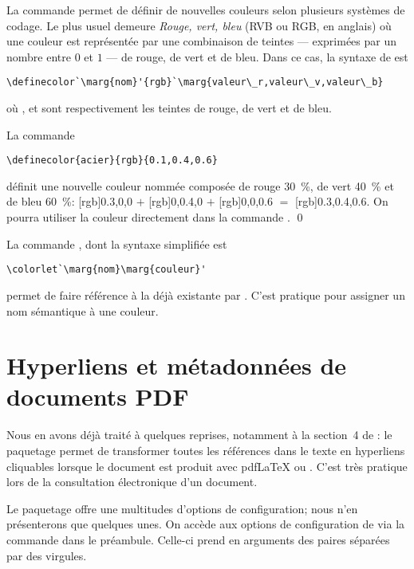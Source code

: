 La commande \cmd{\definecolor} permet de définir de nouvelles couleurs
selon plusieurs systèmes de codage. Le plus usuel demeure \emph{Rouge,
  vert, bleu} (RVB ou RGB, en anglais) où une couleur est représentée
par une combinaison de teintes --- exprimées par un nombre entre $0$
et $1$ --- de rouge, de vert et de bleu. Dans ce cas, la syntaxe de
\cmd{\definecolor} est
\begin{lstlisting}
\definecolor`\marg{nom}'{rgb}`\marg{valeur\_r,valeur\_v,valeur\_b}
\end{lstlisting}
où ,  et  sont
respectivement les teintes de rouge, de vert et de bleu.

\begin{exemple}
  La commande
\begin{lstlisting}
\definecolor{acier}{rgb}{0.1,0.4,0.6}
\end{lstlisting}
  définit une nouvelle couleur nommée  composée de rouge
  30~\%, de vert 40~\% et de bleu 60~\%: %
  [rgb]{0.3,0,0}{\phantom{xx}} $+$ %
  [rgb]{0,0.4,0}{\phantom{xx}} $+$ %
  [rgb]{0,0,0.6}{\phantom{xx}} $=$ %
  [rgb]{0.3,0.4,0.6}{\phantom{xx}}. %
  On pourra utiliser la couleur  directement dans la
  commande \cmdprint{\color}. %
  \qed
\end{exemple}

La commande , dont la syntaxe simplifiée est
\begin{lstlisting}
\colorlet`\marg{nom}\marg{couleur}'
\end{lstlisting}
permet de faire référence à la  déjà existante par
. C'est pratique pour assigner un nom sémantique à une
couleur.



\section{Hyperliens et métadonnées de documents PDF}
\label{sec:trucs:hyperliens}

Nous en avons déjà traité à quelques reprises, notamment à la
section~4 de \citet{UL:latex:1}: le paquetage 
\citep{hyperref} permet de transformer toutes les références dans le
texte en hyperliens cliquables lorsque le document est produit avec
pdf{\LaTeX} ou {\XeLaTeX}. C'est très pratique lors de la consultation
électronique d'un document.

Le paquetage offre une multitudes d'options de configuration; nous
n'en présenterons que quelques unes. On accède aux options de
configuration de  via la commande \cmd{\hypersetup} dans
le préambule. Celle-ci prend en arguments des paires
 séparées par des virgules.

